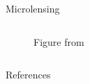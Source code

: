 \documentclass[hyperref={colorlinks = true, linkcolor=blue},8pt]{beamer}
\begin{document}
\begin{frame}{Microlensing}
\begin{columns}
\begin{column}{0.5\columnwidth}
\begin{figure}
			\caption{Figure from \cite{jablonskaThere2022}}
		\end{figure}
\end{column}
\end{columns}

\end{frame}


\begin{frame}{References}
\printbibliography
\end{frame}

\end{document}
